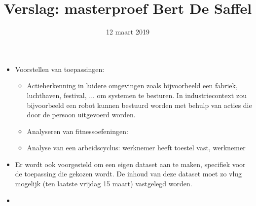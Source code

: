 \documentclass{article}
\title{Verslag: masterproef Bert De Saffel}
\author{12 maart 2019}
\date{}
\begin{document}
   \maketitle

	\begin{itemize}
	   	\item Voorstellen van toepassingen:
	   	\begin{itemize}
	   		\item Actieherkenning in luidere omgevingen zoals bijvoorbeeld een fabriek, luchthaven, festival, ... om systemen te besturen. In industriecontext zou bijvoorbeeld een robot kunnen bestuurd worden met behulp van acties die door de persoon uitgevoerd worden.
	   		\item Analyseren van fitnessoefeningen: 
	   		\item Analyse van een arbeidscyclus: werknemer heeft toestel vast, werknemer 
	   	\end{itemize}	
   		\item Er wordt ook voorgesteld om een eigen dataset aan te maken, specifiek voor de toepassing die gekozen wordt. De inhoud van deze dataset moet zo vlug mogelijk (ten laatste vrijdag 15 maart) vastgelegd worden. 
   		\item  
	\end{itemize}
\end{document}
